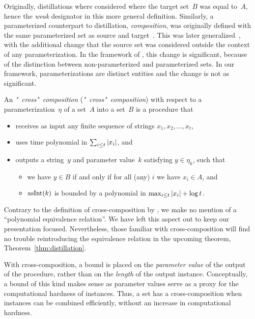 Originally, distillations where considered where the target set~$B$ was equal to~$A$, hence the \emph{weak} designator in this more general definition.
Similarly, a parameterized counterpart to distillation, \emph{composition}, was originally defined with the same parameterized set as source and target~\parencite{bodlaender2009problems}.
This was later generalized~\parencite{bodlaender2014kernelization}, with the additional change that the source set was considered outside the context of any parameterization.
In the framework of \citeauthor{downey1999parameterized}, this change is significant, because of the distinction between non-parameterized and parameterized sets.
In our framework, parameterizations are distinct entities and the change is not as significant.
\begin{definition}
  An \emph{"~cross"~composition} (\emph{"~cross"~composition}) with respect to a parameterization~$\eta$ of a set~$A$ into a set~$B$ is a procedure that
  \begin{itemize}
  \item receives as input any finite sequence of strings $x_1, x_2, \ldots, x_t$,
  \item uses time polynomial in $\sum_{i \le t} {\lvert x_i\rvert}$, and
  \item outputs a string~$y$ and parameter value~$k$ satisfying $y \in \eta_k$, such that
    \begin{itemize}
    \item we have $y \in B$ if and only if for all (any) $i$ we have $x_i \in A$, and
    \item $\operatorname{asInt}(k)$ is bounded by a polynomial in $\max_{i \le t} {\lvert x_i\rvert} + \log t$.
    \end{itemize}
  \end{itemize}
\end{definition}

Contrary to the definition of cross-composition by \textcite{bodlaender2014kernelization}, we make no mention of a \enquote{polynomial equivalence relation}.
We have left this aspect out to keep our presentation focused.
Nevertheless, those familiar with cross-composition will find no trouble reintroducing the equivalence relation in the upcoming theorem, Theorem~\ref{thm:distillation}.

With cross-composition, a bound is placed on the \emph{parameter value} of the output of the procedure, rather than on the \emph{length} of the output instance.
Conceptually, a bound of this kind makes sense as parameter values serve as a proxy for the computational hardness of instances.
Thus, a set has a cross-composition when instances can be combined efficiently, without an increase in computational hardness.

